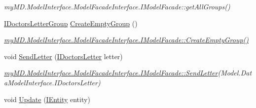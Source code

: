 \begin{CompactItemize}
\begin{CompactList}\small\item\em my\-MD.Model\-Interface.Model\-Facade\-Interface.IModel\-Facade::get\-All\-Groups() \item\end{CompactList}\item 
\hypertarget{classmy_m_d_1_1_model_1_1_model_facade_1_1_model_facade_7ce2fe6e33d0a78829c47a6b2f35e0fe}{
\hyperlink{interfacemy_m_d_1_1_model_interface_1_1_data_model_interface_1_1_i_doctors_letter_group}{IDoctors\-Letter\-Group} \hyperlink{classmy_m_d_1_1_model_1_1_model_facade_1_1_model_facade_7ce2fe6e33d0a78829c47a6b2f35e0fe}{Create\-Empty\-Group} ()}
\label{d5/dc0/classmy_m_d_1_1_model_1_1_model_facade_1_1_model_facade_7ce2fe6e33d0a78829c47a6b2f35e0fe}

\begin{CompactList}\small\item\em \hyperlink{interfacemy_m_d_1_1_model_interface_1_1_model_facade_interface_1_1_i_model_facade_7ce2fe6e33d0a78829c47a6b2f35e0fe}{my\-MD.Model\-Interface.Model\-Facade\-Interface.IModel\-Facade::Create\-Empty\-Group()} \item\end{CompactList}\item 
\hypertarget{classmy_m_d_1_1_model_1_1_model_facade_1_1_model_facade_dbd560ba513112ff2c7fcf625fdf6597}{
void \hyperlink{classmy_m_d_1_1_model_1_1_model_facade_1_1_model_facade_dbd560ba513112ff2c7fcf625fdf6597}{Send\-Letter} (\hyperlink{interfacemy_m_d_1_1_model_interface_1_1_data_model_interface_1_1_i_doctors_letter}{IDoctors\-Letter} letter)}
\label{d5/dc0/classmy_m_d_1_1_model_1_1_model_facade_1_1_model_facade_dbd560ba513112ff2c7fcf625fdf6597}

\begin{CompactList}\small\item\em \hyperlink{interfacemy_m_d_1_1_model_interface_1_1_model_facade_interface_1_1_i_model_facade_dbd560ba513112ff2c7fcf625fdf6597}{my\-MD.Model\-Interface.Model\-Facade\-Interface.IModel\-Facade::Send\-Letter}(Model.Data\-Model\-Interface.IDoctors\-Letter) \item\end{CompactList}\item 
\hypertarget{classmy_m_d_1_1_model_1_1_model_facade_1_1_model_facade_bf510dc6cf79d153f564eca0f10971d2}{
void \hyperlink{classmy_m_d_1_1_model_1_1_model_facade_1_1_model_facade_bf510dc6cf79d153f564eca0f10971d2}{Update} (\hyperlink{interfacemy_m_d_1_1_model_interface_1_1_data_model_interface_1_1_i_entity}{IEntity} entity)}
\label{d5/dc0/classmy_m_d_1_1_model_1_1_model_facade_1_1_model_facade_bf510dc6cf79d153f564eca0f10971d2}


\end{CompactItemize}
